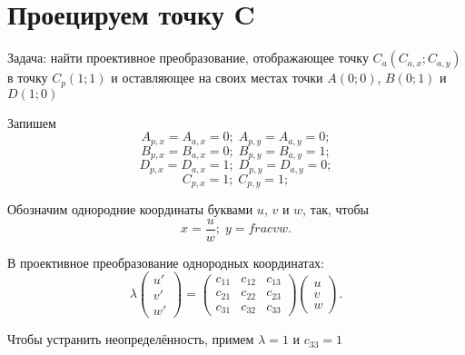 \section{Проецируем точку C}

Задача: найти проективное преобразование, отображающее точку $C_a(C_{a,x};C_{a,y})$ в точку $C_p(1;1)$ и оставляющее на своих местах точки $A(0;0)$, $B(0;1)$ и $D(1;0)$

Запишем
$$ A_{p,x} = A_{a,x} = 0;\; A_{p,y} = A_{a,y} = 0;$$
$$ B_{p,x} = B_{a,x} = 0;\; B_{p,y} = B_{a,y} = 1;$$
$$ D_{p,x} = D_{a,x} = 1;\; D_{p,y} = D_{a,y} = 0;$$
$$ C_{p,x} = 1;\; C_{p,y} = 1;$$


Обозначим однородние координаты  буквами $u$, $v$ и $w$, так, чтобы
$$x = \frac{u}{w};\; y = frac{v}{w}.$$


В проективное преобразование однородных координатах:
$$
\lambda
\begin{pmatrix}	u' \\ v' \\ w' \end{pmatrix}
= 
\begin{pmatrix}
	c_{11} & c_{12} & c_{13} \\
	c_{21} & c_{22} & c_{23} \\
	c_{31} & c_{32} & c_{33}
\end{pmatrix}
\begin{pmatrix}	u \\ v \\ w \end{pmatrix}
.
$$

Чтобы устранить неопределённость, примем $\lambda = 1$ и $c_{33} = 1$

